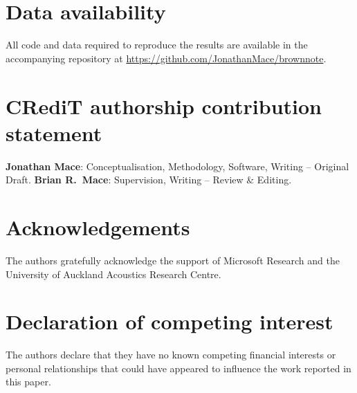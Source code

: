 \documentclass[review]{elsarticle}
\begin{document}
\graphicspath{{figures/}}


















\section*{Data availability}
All code and data required to reproduce the results are available in the
accompanying repository at \url{https://github.com/JonathanMace/brownnote}.

\section*{CRediT authorship contribution statement}
\textbf{Jonathan Mace}: Conceptualisation, Methodology, Software,
Writing -- Original Draft.
\textbf{Brian R.\ Mace}: Supervision, Writing -- Review \& Editing.

\section*{Acknowledgements}
The authors gratefully acknowledge the support of Microsoft Research
and the University of Auckland Acoustics Research Centre.

\section*{Declaration of competing interest}
The authors declare that they have no known competing financial interests
or personal relationships that could have appeared to influence the work
reported in this paper.
\end{document}
